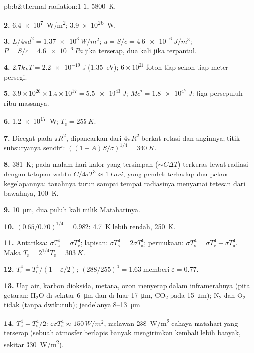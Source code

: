 \begin{solution}{pb:b2:thermal-radiation:1}
\textbf{1.} \qty{5800}{K}.

\textbf{2.} \qty{6.4e7}{W/m^2}; \qty{3.9e26}{W}.

\textbf{3.} $L/4\pi d^2 = \qty{1.37e3}{W/m^2}$; $u = S/c = \qty{4.6e-6}{J/m^3}$;
$P = S/c = \qty{4.6e-6}{Pa}$ jika terserap, dua kali jika terpantul.

\textbf{4.} $2.7k_BT = \qty{2.2e-19}{J}$ (\qty{1.35}{eV}); $6 \times 10^{21}$
foton tiap sekon tiap meter persegi.

\textbf{5.} $3.9 \times 10^{26} \times 1.4 \times 10^{17} = \qty{5.5e43}{J}$; $Mc^2 =
\qty{1.8e47}{J}$: tiga persepuluh ribu massanya.

\textbf{6.} \qty{1.2e17}{W}; $T_{\text{e}} = \qty{255}{K}$.

\textbf{7.} Dicegat pada $\pi R^2$, dipancarkan dari $4\pi R^2$ berkat
rotasi dan anginnya; titik subsuryanya sendiri: $((1 - A)S/\sigma)^{1/4} =
\qty{360}{K}$.

\textbf{8.} \qty{381}{K}; pada malam hari kalor yang tersimpan ($\sim C\Delta T$) terkuras lewat
radiasi dengan tetapan waktu $C/4\sigma T^3 \approx \qty{1}{hari}$, yang pendek
terhadap dua pekan kegelapannya: tanahnya turun sampai tempat
radiasinya menyamai tetesan dari bawahnya, \qty{100}{K}.

\textbf{9.} \qty{10}{\micro m}, dua puluh kali milik Mataharinya.

\textbf{10.} $(0.65/0.70)^{1/4} = 0.982$: \qty{4.7}{K} lebih rendah, \qty{250}{K}.

\textbf{11.} Antariksa: $\sigma T_{\text{a}}^4 = \sigma T_{\text{e}}^4$; lapisan: $\sigma
T_{\text{s}}^4 = 2\sigma T_{\text{a}}^4$; permukaan: $\sigma T_{\text{s}}^4 = \sigma
T_{\text{e}}^4 + \sigma T_{\text{a}}^4$. Maka $T_{\text{s}} = 2^{1/4}T_{\text{e}} = \qty{303}{K}$.

\textbf{12.} $T_{\text{s}}^4 = T_{\text{e}}^4/(1 - \varepsilon/2)$; $(288/255)^4 = 1.63$
memberi $\varepsilon = 0.77$.

\textbf{13.} Uap air, karbon dioksida, metana, ozon menyerap dalam
inframerahnya (pita getaran: H$_2$O di sekitar \qty{6}{\micro m} dan di luar
\qty{17}{\micro m}, CO$_2$ pada \qty{15}{\micro m}); N$_2$ dan O$_2$ tidak (tanpa
dwikutub); jendelanya \qty{8}{}--\qty{13}{\micro m}.

\textbf{14.} $T_{\text{a}}^4 = T_{\text{s}}^4/2$: $\varepsilon\sigma T_{\text{a}}^4 \approx
\qty{150}{W/m^2}$, melawan \qty{238}{W/m^2} cahaya matahari yang terserap (sebuah
atmosfer berlapis banyak mengirimkan kembali lebih banyak, sekitar \qty{330}{W/m^2}).


\end{solution}
